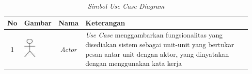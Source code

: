 \begin{enumerate}
\captionsetup{position=above} %
\begin{small}
			\begin{longtable}[c]{|c|>{\centering\arraybackslash}m{2cm}|c|p{7.6cm}|}
			\caption{\textit{Simbol Use Case Diagram}} \label{tab:my-table}\\ %
			\hline
			No & Gambar & Nama & Keterangan \\ \hline
			\endfirsthead
			\endhead
			1 & \parbox[c][2cm][c]{2cm}{\centering \includegraphics[height=1cm]{useCase/actor.jpg}} & \textit{Actor} & \textit{Use Case} menggambarkan fungsionalitas yang disediakan sistem sebagai unit-unit yang bertukar pesan antar unit dengan aktor, yang dinyatakan dengan menggunakan kata kerja \\ \hline
			

\end{longtable}
\end{small}
\end{enumerate}
